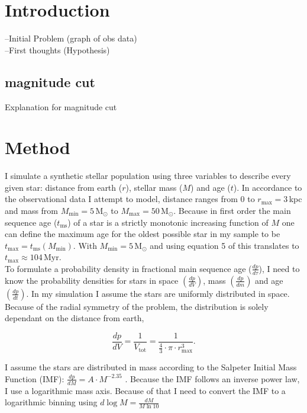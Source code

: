 \documentclass[a4paper,10pt]{article}
\date{03/15/15}
\begin{document}
 \section{Introduction}
 --Initial Problem (graph of obs data)\\
 --First thoughts (Hypothesis)\\
 \subsection{magnitude cut}
 Explanation for magnitude cut \label{magnitudecut}
 \section{Method}
 
 I simulate a synthetic stellar population using three variables to describe every given star: distance from earth ($r$), stellar mass ($M$) 
 and age ($t$). In accordance to the observational data I attempt to model, distance ranges from 0 to $r_{\mathrm{max}}=3\,$kpc and mass
 from $M_{\mathrm{min}}=5\,\mathrm{M}_\odot$ to $M_{\mathrm{max}}=50\,\mathrm{M}_\odot$. Because in first order the main sequence age 
 ($t_{\mathrm{ms}}$) of 
 a star is a strictly monotonic increasing function of $M$ one can define the maximum age for the oldest possible star in my sample to be
 $t_{\mathrm{max}}=t_{\mathrm{ms}}(M_{\mathrm{min}})$. With $M_{\mathrm{min}}=5\,\mathrm{M}_\odot$ and using equation 5 of 
 \citep*{2000MNRAS.315..543H} this translates to $t_{\mathrm{max}}\approx 104\,\mathrm{Myr}$.\\
 
 To formulate a probability density in fractional main sequence age ($\frac{dp}{d\tau}$), I need to know the probability densities for stars in space 
 $\left(\frac{dp}{dV}\right)$, mass 
 $\left(\frac{dp}{dm}\right)$ and age $\left(\frac{dp}{dt}\right)$. In my simulation I assume the stars are uniformly distributed in space. 
 Because of the radial symmetry of the problem, the distribution is solely dependant on the distance from earth,
 
 \begin{equation}
  \frac{dp}{dV}=\frac{1}{V_{\mathrm{tot}}}=\frac{1}{\frac43\cdot\pi\cdot r_{\mathrm{max}}^3}.
  \label{dpdV}
 \end{equation}
 
  I assume the stars are distributed in mass according to the Salpeter Initial Mass Function (IMF):
 $\frac{dp}{dM}=A\cdot M^{-2.35}$ \citep*{1955ApJ...121..161S}. Because the IMF follows an inverse power law, I use a logarithmic mass axis.
 Because of that I need to convert the IMF to a logarithmic binning using $d\log M = \frac{dM}{M\ln 10}$
 
\end{document}
